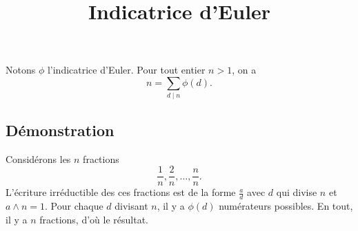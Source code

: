 \documentclass[fontsize=12pt,twoside=false,parskip=half]{scrartcl}
\title{Indicatrice d’Euler}
\date{}
\author{}
\begin{document}
\maketitle
   \begin{Theoreme}
      Notons $\phi$ l’indicatrice d’Euler. Pour tout entier $n > 1$, on a
      \[
         n = \sum_{d \mid n} \phi(d).
      \]
   \end{Theoreme}
   \subsection{Démonstration}
      Considérons les $n$ fractions
      \[
         \frac{1}{n}, \frac{2}{n}, \ldots, \frac{n}{n}.
      \]
      L’écriture irréductible des ces fractions est de la forme $\frac{a}{d}$ avec $d$ qui divise
      $n$ et $a \wedge n = 1$. Pour chaque $d$ divisant $n$, il y a $\phi(d)$ numérateurs possibles.
      En tout, il y a $n$ fractions, d’où le résultat.
\end{document}
